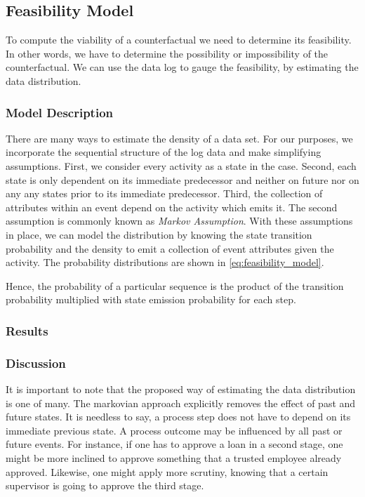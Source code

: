 \documentclass[./../../paper.tex]{subfiles}
\begin{document}
\subsection{Feasibility Model}
To compute the viability of a counterfactual we need to determine its feasibility. In other words, we have to determine the possibility or impossibility of the counterfactual. We can use the data log to gauge the feasibility, by estimating the data distribution.

\subsubsection{Model Description}
There are many ways to estimate the density of a data set. For our purposes, we incorporate the sequential structure of the log data and make simplifying assumptions. First, we consider every activity as a state in the case. Second, each state is only dependent on its immediate predecessor and neither on future nor on any any states prior to its immediate predecessor. Third, the collection of attributes within an event depend on the activity which emits it. The second assumption is commonly known as \emph{Markov Assumption}. With these assumptions in place, we can model the distribution by knowing the state transition probability and the density to emit a collection of event attributes given the activity. The probability distributions are shown in \autoref{eq:feasibility_model}. 


Hence, the probability of a particular sequence is the product of the transition probability multiplied with state emission probability for each step.  

\subsubsection{Results}

\subsubsection{Discussion}
It is important to note that the proposed way of estimating the data distribution is one of many. The markovian approach explicitly removes the effect of past and future states. It is needless to say, a process step does not have to depend on its immediate previous state. A process outcome may be influenced by all past or future events. For instance, if one has to approve a loan in a second stage, one might be more inclined to approve something that a trusted employee already approved. Likewise, one might apply more scrutiny, knowing that a certain supervisor is going to approve the third stage. 
\end{document}
